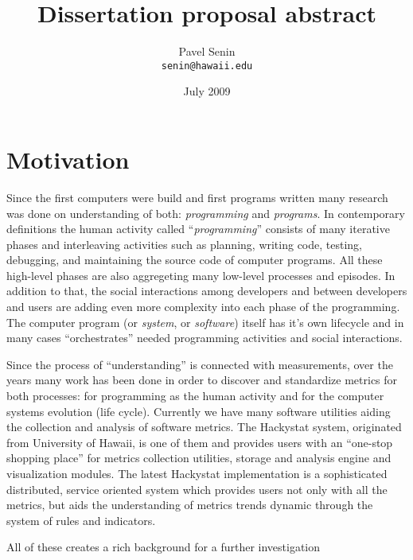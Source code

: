\documentclass[11pt,oneside]{article}
\begin{document}
\title{Dissertation proposal abstract}
\author{Pavel Senin \\
 \texttt{senin@hawaii.edu}
}
\date{July 2009}
\maketitle

\section{Motivation}
Since the first computers were build and first programs written many research was done on understanding of both: \textit{programming} and \textit{programs}. In contemporary definitions the human activity called ``\textit{programming}'' consists of many iterative phases and interleaving activities such as planning, writing code, testing, debugging, and maintaining the source code of computer programs. All these high-level phases are also aggregeting many low-level processes and episodes. In addition to that, the social interactions among developers and between developers and users are adding even more complexity into each phase of the programming. The computer program (or \textit{system}, or \textit{software}) itself has it's own lifecycle and in many cases ``orchestrates'' needed programming activities and social interactions.

Since the process of ``understanding'' is connected with measurements, over the years many work has been done in order to discover and standardize metrics for both processes: for programming as the human activity and for the computer systems evolution (life cycle). Currently we have many software utilities aiding the collection and analysis of software metrics. The Hackystat system, originated from University of Hawaii, is one of them and provides users with an ``one-stop shopping place'' for metrics collection utilities, storage and analysis engine and visualization modules. The latest Hackystat implementation is a sophisticated distributed, service oriented system which provides users not only with all the metrics, but aids the understanding of metrics trends dynamic through the system of rules and indicators.

All of these creates a rich background for a further investigation 
\end{document}
